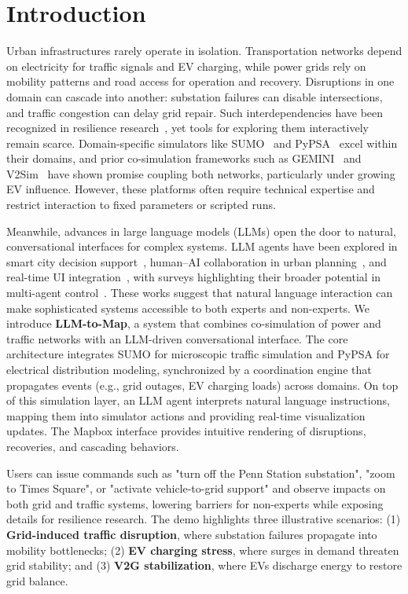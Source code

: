 \documentclass[sigconf,review,nonacm]{acmart}
\begin{document}
\section{Introduction}
Urban infrastructures rarely operate in isolation. Transportation networks depend on electricity for traffic signals and EV charging, while power grids rely on mobility patterns and road access for operation and recovery. Disruptions in one domain can cascade into another: substation failures can disable intersections, and traffic congestion can delay grid repair. Such interdependencies have been recognized in resilience research~\cite{ouyang2014review, buldyrev2010catastrophic}, yet tools for exploring them interactively remain scarce.
Domain-specific simulators like SUMO~\cite{lopez2018sumo} and PyPSA~\cite{brown2018pypsa} excel within their domains, and prior co-simulation frameworks such as GEMINI~\cite{panossian2023architecture} and V2Sim~\cite{qian2024v2sim} have shown promise coupling both networks, particularly under growing EV influence. However, these platforms often require technical expertise and restrict interaction to fixed parameters or scripted runs.

Meanwhile, advances in large language models (LLMs) open the door to natural, conversational interfaces for complex systems. LLM agents have been explored in smart city decision support~\cite{kalyuzhnaya2025llm}, human–AI collaboration in urban planning~\cite{han2025large}, and real-time UI integration~\cite{pozdniakov2024large}, with surveys highlighting their broader potential in multi-agent control~\cite{guo2024large}. These works suggest that natural language interaction can make sophisticated systems accessible to both experts and non-experts.
We introduce \textbf{LLM-to-Map}, a system that combines co-simulation of power and traffic networks with an LLM-driven conversational interface. The core architecture integrates SUMO for microscopic traffic simulation and PyPSA for electrical distribution modeling, synchronized by a coordination engine that propagates events (e.g., grid outages, EV charging loads) across domains. On top of this simulation layer, an LLM agent interprets natural language instructions, mapping them into simulator actions and providing real-time visualization updates. The Mapbox interface provides intuitive rendering of disruptions, recoveries, and cascading behaviors.

Users can issue commands such as "turn off the Penn Station substation", "zoom to Times Square", or "activate vehicle-to-grid support" and observe impacts on both grid and traffic systems, lowering barriers for non-experts while exposing details for resilience research.
The demo highlights three illustrative scenarios:
(1) \textbf{Grid-induced traffic disruption}, where substation failures propagate into mobility bottlenecks; (2) \textbf{EV charging stress}, where surges in demand threaten grid stability; and (3) \textbf{V2G stabilization}, where EVs discharge energy to restore grid balance.
\end{document}
